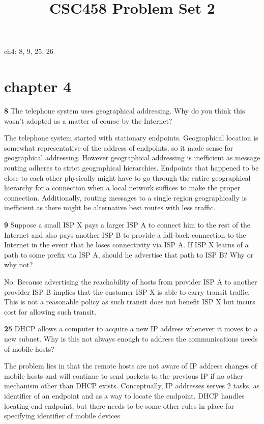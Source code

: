 \documentclass[11pt]{article}
\title{CSC458 Problem Set 2}
\begin{document}
\maketitle


ch4: 8, 9, 25, 26


\section*{chapter 4}

\textbf{8} The telephone system uses geographical addressing. Why do you think this wasn’t adopted as a matter of course by the Internet?

\begin{solution}
    The telephone system started with stationary endpoints. Geographical location is somewhat representative of the address of endpoints, so it made sense for geographical addressing. However geographical addressing is inefficient as message routing adheres to strict geographical hierarchies. Endpoints that happened to be close to each other physically might have to go through the entire geographical hierarchy for a connection when a local network suffices to make the proper connection. Additionally, routing messages to a single region geographically is inefficient as there might be alternative best routes with less traffic.
\end{solution}

\textbf{9}  Suppose a small ISP X pays a larger ISP A to connect him to the rest of the Internet and also pays another ISP B to provide a fall-back connection to the Internet in the event that he loses connectivity via ISP A. If ISP X learns of a path to some prefix via ISP A, should he advertise that path to ISP B? Why or why not?


\begin{solution}
    No. Because advertising the reachability of hosts from provider ISP A to another provider ISP B implies that the customer ISP X is able to carry transit traffic. This is not a reasonable policy as such transit does not benefit ISP X but incurs cost for allowing such transit.
\end{solution}

\textbf{25} DHCP allows a computer to acquire a new IP address whenever it moves to a new subnet. Why is this not always enough to address the communications needs of mobile hosts?

\begin{solution}
    The problem lies in that the remote hosts are not aware of IP address changes of mobile hosts and will continue to send packets to the previous IP if no other mechanism other than DHCP exists. Conceptually, IP addresses serves 2 tasks, as identifier of an endpoint and as a way to locate the endpoint. DHCP handles locating end endpoint, but there needs to be some other rules in place for specifying identifier of mobile devices
\end{solution}
\end{document}
